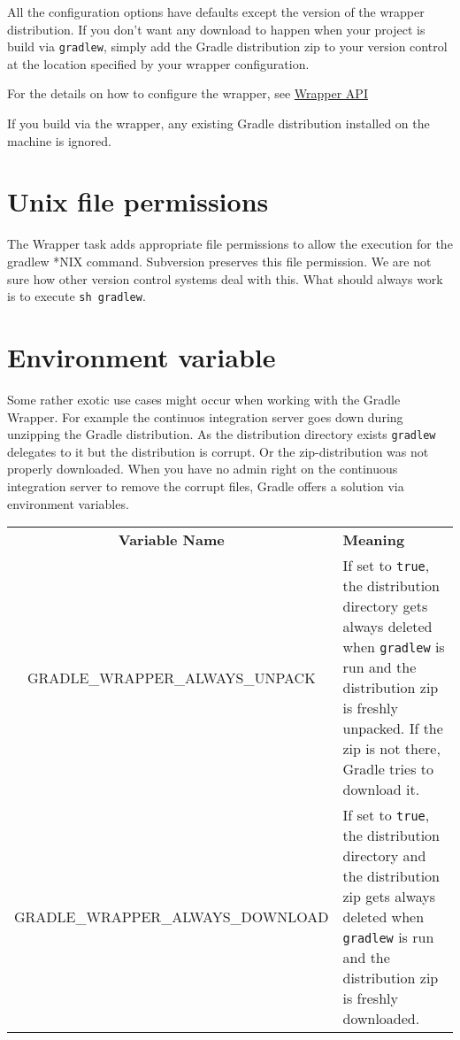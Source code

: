 All the configuration options have defaults except the version of the wrapper distribution. If you don't want any download to happen when your project is build via \texttt{gradlew}, simply add the Gradle distribution zip to your version control at the location specified by your wrapper configuration. 

For the details on how to configure the wrapper, see \href{\API tasks/wrapper/Wrapper.html}{Wrapper API}

If you build via the wrapper, any existing Gradle distribution installed on the machine is ignored.

\section{Unix file permissions} %
\label{sec:unix_file_permissions}
The Wrapper task adds appropriate file permissions to allow the execution for the gradlew *NIX command. Subversion preserves this file permission. We are not sure how other version control systems deal with this. What should always work is to execute \texttt{sh gradlew}. 

\section{Environment variable} %
\label{sec:environment_variable}
Some rather exotic use cases might occur when working with the Gradle Wrapper. For example the continuos integration server goes down during unzipping the Gradle distribution. As the distribution directory exists \texttt{gradlew} delegates to it but the distribution is corrupt. Or the zip-distribution was not properly downloaded. When you have no admin right on the continuous integration server to remove the corrupt files, Gradle offers a solution via environment variables.

\begin{tabularx}{\textwidth}{cX} 
	\textbf{Variable Name} & \centerline{\textbf{Meaning}}\\
    GRADLE\_WRAPPER\_ALWAYS\_UNPACK & If set to \texttt{true}, the distribution directory gets always deleted when \texttt{gradlew} is run and the distribution zip is freshly unpacked. If the zip is not there, Gradle tries to download it. \\
	GRADLE\_WRAPPER\_ALWAYS\_DOWNLOAD & If set to \texttt{true}, the distribution directory and the distribution zip gets always deleted when \texttt{gradlew} is run and the distribution zip is freshly downloaded. \\
\end{tabularx}
